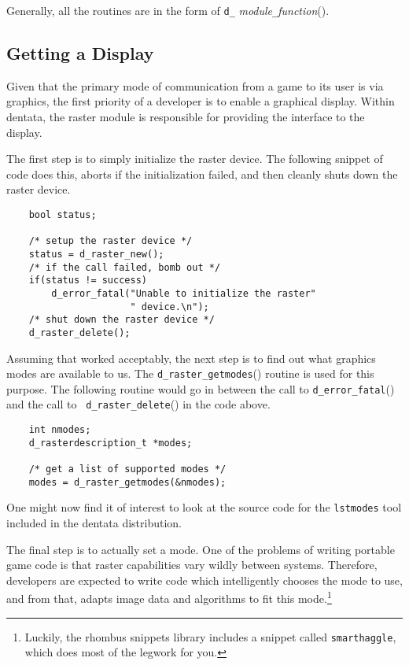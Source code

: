 Generally, all the routines are in the form of {\tt d\_}{\it
module}{\tt \_}{\it function}().

\subsection{Getting a Display}

Given that the primary mode of communication from a game to its
user is via graphics, the first priority of a developer is to
enable a graphical display. Within dentata, the raster module is
responsible for providing the interface to the display.

The first step is to simply initialize the raster device. The following
snippet of code does this, aborts if the initialization failed, and then
cleanly shuts down the raster device.

\begin{verbatim}
    bool status;

    /* setup the raster device */
    status = d_raster_new();
    /* if the call failed, bomb out */
    if(status != success)
        d_error_fatal("Unable to initialize the raster"
                      " device.\n");
    /* shut down the raster device */
    d_raster_delete();
\end{verbatim}

Assuming that worked acceptably, the next step is to find out what
graphics modes are available to us. The {\tt d\_raster\_getmodes}()
routine is used for this purpose. The following routine would go in
between the call to {\tt d\_error\_fatal}() and the call to {\tt
d\_raster\_delete}() in the code above.

\begin{verbatim}
    int nmodes;
    d_rasterdescription_t *modes;

    /* get a list of supported modes */
    modes = d_raster_getmodes(&nmodes);
\end{verbatim}

One might now find it of interest to look at the source code for
the {\tt lstmodes} tool included in the dentata distribution.

The final step is to actually set a mode. One of the problems of
writing portable game code is that raster capabilities vary wildly
between systems. Therefore, developers are expected to write code
which intelligently chooses the mode to use, and from that, adapts
image data and algorithms to fit this mode.\footnote{Luckily, the rhombus
snippets library includes a snippet called {\tt smarthaggle}, which does
most of the legwork for you.}

